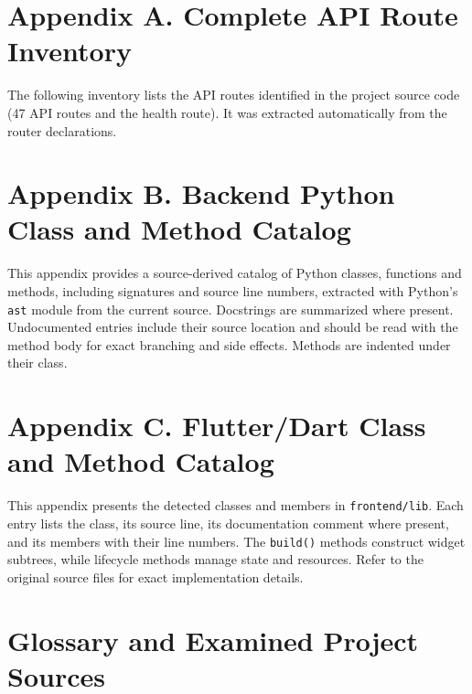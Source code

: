 
\section{Appendix A. Complete API Route Inventory}
The following inventory lists the API routes identified in the project source code (47 API routes and the health route). It was extracted automatically from the router declarations.
\renewcommand{\routecaption}{Complete API route inventory.}


\section{Appendix B. Backend Python Class and Method Catalog}
This appendix provides a source-derived catalog of Python classes, functions and methods, including signatures and source line numbers, extracted with Python's \texttt{ast} module from the current source. Docstrings are summarized where present. Undocumented entries include their source location and should be read with the method body for exact branching and side effects. Methods are indented under their class.
{\small

}

\section{Appendix C. Flutter/Dart Class and Method Catalog}
This appendix presents the detected classes and members in \texttt{frontend/lib}. Each entry lists the class, its source line, its documentation comment where present, and its members with their line numbers. The \texttt{build()} methods construct widget subtrees, while lifecycle methods manage state and resources. Refer to the original source files for exact implementation details.
{\small

}

\section{Glossary and Examined Project Sources}
